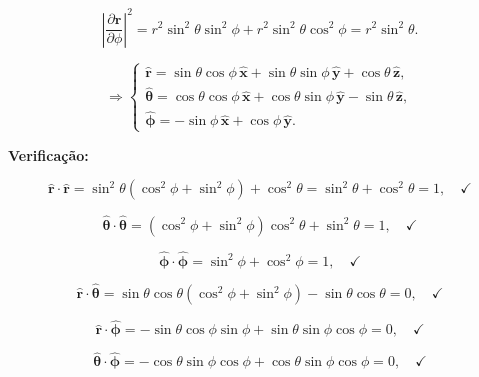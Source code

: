 \documentclass[a4paper,12pt]{article}
\begin{document}
\begin{equation}
\left| \frac{\partial \mathbf{r}}{\partial \phi} \right|^2 = r^2 \sin^2\theta \sin^2\phi + r^2 \sin^2\theta \cos^2\phi = r^2 \sin^2\theta.
\end{equation}

\begin{equation}\label{eq:r-theta-phi}
\Rightarrow
\begin{cases}
\hat{\mathbf{r}} = \sin\theta \cos\phi \, \hat{\mathbf{x}} + \sin\theta \sin\phi \, \hat{\mathbf{y}} + \cos\theta \, \hat{\mathbf{z}}, \\
\hat{\bm{\theta}} = \cos\theta \cos\phi \, \hat{\mathbf{x}} + \cos\theta \sin\phi \, \hat{\mathbf{y}} - \sin\theta \, \hat{\mathbf{z}}, \\
\hat{\bm{\phi}} = -\sin\phi \, \hat{\mathbf{x}} + \cos\phi \, \hat{\mathbf{y}}.
\end{cases}
\end{equation}

\textbf{Verificação:}

\begin{equation}
\hat{\mathbf{r}} \cdot \hat{\mathbf{r}} = \sin^2\theta (\cos^2\phi + \sin^2\phi) + \cos^2\theta = \sin^2\theta + \cos^2\theta = 1, \quad \checkmark
\end{equation}

\begin{equation}
\hat{\bm{\theta}} \cdot \hat{\bm{\theta}} = ( \cos^{2}\phi + \sin^{2}\phi)\cos^{2}\theta + \sin^{2}\theta = 1, \quad \checkmark
\end{equation}

\begin{equation}
\hat{\bm{\phi}} \cdot \hat{\bm{\phi}} =\sin^{2}\phi + \cos^{2}\phi = 1, \quad \checkmark
\end{equation}

\begin{equation}
\hat{\mathbf{r}} \cdot \hat{\bm{\theta}} = \sin\theta \cos\theta( \cos^{2}\phi + \sin^{2}\phi) - \sin\theta \cos\theta  = 0, \quad \checkmark
\end{equation}

\begin{equation}
    \hat{\mathbf{r}} \cdot \hat{\bm{\phi}} = -\sin\theta \cos\phi \sin\phi + \sin\theta \sin\phi \cos\phi = 0, \quad \checkmark
\end{equation}

\begin{equation}
\hat{\bm{\theta}} \cdot \hat{\bm{\phi}} = -\cos\theta \sin\phi \cos\phi + \cos\theta \sin\phi \cos\phi = 0, \quad \checkmark
\end{equation}
\end{document}
